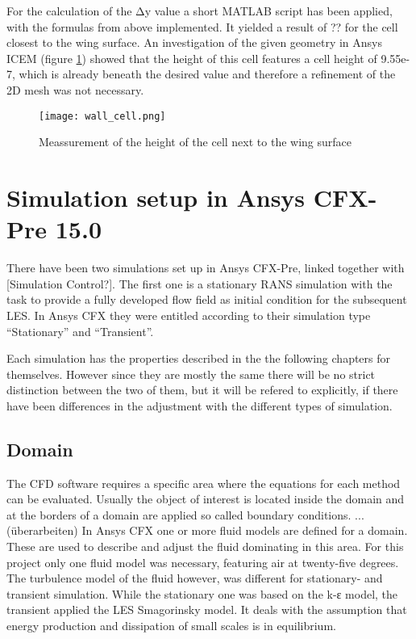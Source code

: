 For the calculation of the Δy value a short MATLAB script has been applied, with the formulas from above implemented. It yielded a result of ?? for the cell closest to the wing surface. An investigation of the given geometry in Ansys ICEM (figure \ref{fig:y1_height}) showed that the height of this cell features a cell height of 9.55e-7, which is already beneath the desired value and therefore a refinement of the 2D mesh was not necessary. 
\begin{figure}[h]
\centering
\texttt{[image: wall\_cell.png]}
\caption{Meassurement of the height of the cell next to the wing surface}
\label{fig:y1_height}
\end{figure}

\section{Simulation setup in Ansys CFX-Pre 15.0}
There have been two simulations set up in Ansys CFX-Pre, linked together with [Simulation Control?]. The first one is a stationary RANS simulation with the task to provide a fully developed flow field as initial condition for the subsequent LES. In Ansys CFX they were entitled according to their simulation type ``Stationary'' and ``Transient''.

Each simulation has the properties described in the the following chapters for themselves. However since they are mostly the same there will be no strict distinction between the two of them, but it will be refered to explicitly, if there have been differences in the adjustment with the different types of simulation.
\subsection{Domain}
The CFD software requires a specific area where the equations for each method can be evaluated. Usually the object of interest is located inside the domain and at the borders of a domain are applied so called boundary conditions. ... (überarbeiten)
In Ansys CFX one or more fluid models are defined for a domain. These are used to describe and adjust the fluid dominating in this area. For this project only one fluid model was necessary, featuring air at twenty-five degrees.
The turbulence model of the fluid however, was different for stationary- and transient simulation. While the stationary one was based on the k-ε model, the transient applied the LES Smagorinsky model. It deals with the assumption that energy production and dissipation of small scales is in equilibrium.
